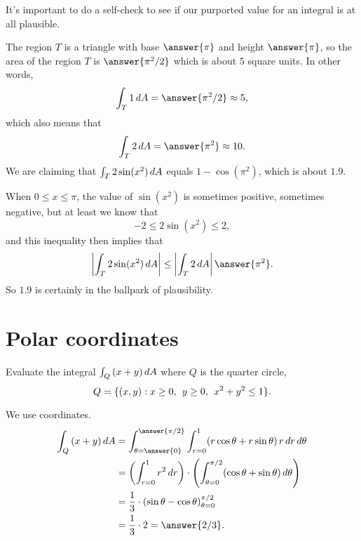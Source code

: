 \documentclass{ximera}
\begin{document}
\begin{question}
  It's important to do a self-check to see if our purported value for
  an integral is at all plausible.

  The region $T$ is a triangle with base $\answer{\pi}$ and height
  $\answer{\pi}$, so the area of the region $T$ is $\answer{\pi^2/2}$
  which is about $5$ square units.  In other words,
  \[
    \int_T 1 \d A = \answer{\pi^2/2} \approx 5,
  \]
  which also means that
  \[
    \int_T 2 \d A = \answer{\pi^2} \approx 10.
  \]
  We are claiming that $\int_T 2 \sin (x^2) \mathop{}\!d A$ equals
  $1 - \cos (\pi^2)$, which is about $1.9$.

  When $0 \leq x \leq \pi$, the value of $\sin (x^2)$ is sometimes
  positive, sometimes negative, but at least we know that
  \[
    -2 \leq 2 \sin (x^2) \leq 2,
  \]
  and this inequality then implies that
  \[
    \left| \int_T 2 \sin (x^2) \d A \right| \leq \left| \int_T 2 \d A \right| \answer{\pi^2}.
  \]
  So $1.9$ is certainly in the ballpark of plausibility.
\end{question}

\section{Polar coordinates}

\begin{example}
  Evaluate the integral $\int_Q \left(x + y\right) \mathop{}\!d A$ where $Q$ is the quarter circle,
  \[
    Q = \{ (x,y)  : x \geq 0,\hspace{1ex} y \geq 0,\hspace{1ex} x^2 + y^2 \leq 1 \}.
  \]

  \begin{explanation}
    We use  coordinates.
    \begin{align*}
      \int_Q \left(x + y\right) \d A
      &= \int_{\theta=\answer{0}}^{\answer{\pi/2}} \int_{r=0}^{1} (r \cos \theta + r \sin \theta) \, r \d r \d \theta \\  
      &= \left( \int_{r=0}^{1} r^2 \d r \right) \cdot \left( \int_{\theta=0}^{\pi/2} (\cos \theta + \sin \theta) \d \theta \right) \\  
      &= \frac{1}{3}  \cdot \left(\sin \theta - \cos \theta\right)_{\theta=0}^{\pi/2} \\
      &= \frac{1}{3} \cdot 2 = \answer{2/3}.
    \end{align*}
  \end{explanation}
\end{example}
\end{document}
